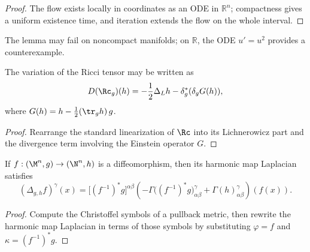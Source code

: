 \begin{proof}
\sketch The flow exists locally in coordinates as an ODE in \(\mathbb R^n\); compactness gives a uniform existence time, and iteration extends the flow on the whole interval.
\end{proof}

\begin{remark}
\label{ch03-rem-noncompact-flow-failure}

The lemma may fail on noncompact manifolds; on \(\mathbb R\), the ODE \(u'=u^2\) provides a counterexample.
\end{remark}

\begin{lemma}
\label{ch03-lem-riemann-tensor-decomposition}

The variation of the Ricci tensor may be written as
\[
D(\Rc_g)(h)=-\frac12\Delta_L h-\delta_g^*(\delta_g G(h)),
\]
where \(G(h)=h-\frac12(\tr_g h)\,g\).
\end{lemma}

\begin{proof}
\sketch Rearrange the standard linearization of \(\Rc\) into its Lichnerowicz part and the divergence term involving the Einstein operator \(G\).
\end{proof}

\begin{lemma}
\label{ch03-lem-harmonic-map-laplacian}

If \(f:(\M^n,g)\to(\N^n,h)\) is a diffeomorphism, then its harmonic map Laplacian satisfies
\[
(\Delta_{g,h}f)^\gamma(x)
=\bigl[(f^{-1})^*g\bigr]^{\alpha\beta}
\left(-\Gamma\bigl((f^{-1})^*g\bigr)^\gamma_{\alpha\beta}+\Gamma(h)^\gamma_{\alpha\beta}\right)\!(f(x)).
\]
\end{lemma}

\begin{proof}
\sketch Compute the Christoffel symbols of a pullback metric, then rewrite the harmonic map Laplacian in terms of those symbols by substituting \(\varphi=f\) and \(\kappa=(f^{-1})^*g\).
\end{proof}

